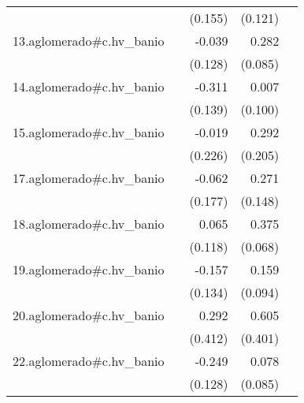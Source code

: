 {\begin{longtable}{l*{4}{D{.}{.}{-1}}}
            &                     &     (0.155)         &     (0.121)         &                     \\
\addlinespace
13.aglomerado#c.hv\_banio&                     &      -0.039         &       0.282\sym{***}&                     \\
            &                     &     (0.128)         &     (0.085)         &                     \\
\addlinespace
14.aglomerado#c.hv\_banio&                     &      -0.311\sym{*}  &       0.007         &                     \\
            &                     &     (0.139)         &     (0.100)         &                     \\
\addlinespace
15.aglomerado#c.hv\_banio&                     &      -0.019         &       0.292         &                     \\
            &                     &     (0.226)         &     (0.205)         &                     \\
\addlinespace
17.aglomerado#c.hv\_banio&                     &      -0.062         &       0.271         &                     \\
            &                     &     (0.177)         &     (0.148)         &                     \\
\addlinespace
18.aglomerado#c.hv\_banio&                     &       0.065         &       0.375\sym{***}&                     \\
            &                     &     (0.118)         &     (0.068)         &                     \\
\addlinespace
19.aglomerado#c.hv\_banio&                     &      -0.157         &       0.159         &                     \\
            &                     &     (0.134)         &     (0.094)         &                     \\
\addlinespace
20.aglomerado#c.hv\_banio&                     &       0.292         &       0.605         &                     \\
            &                     &     (0.412)         &     (0.401)         &                     \\
\addlinespace
22.aglomerado#c.hv\_banio&                     &      -0.249         &       0.078         &                     \\
            &                     &     (0.128)         &     (0.085)         &                     \\

\end{longtable}}
